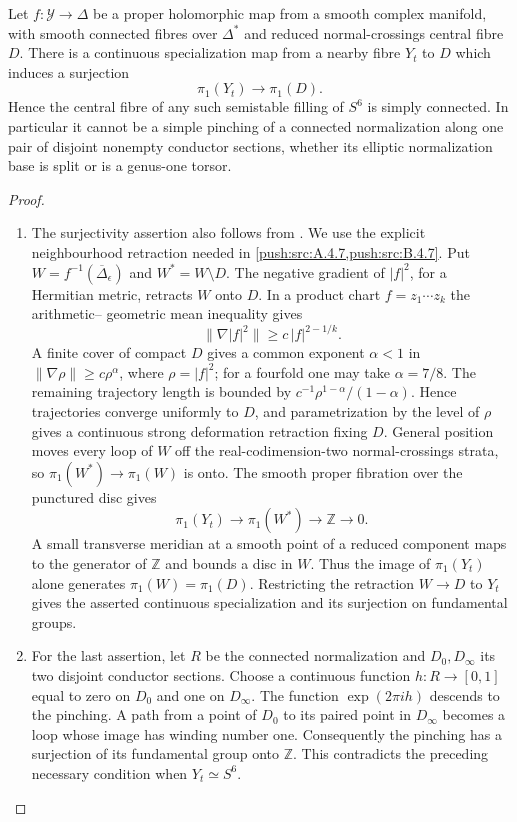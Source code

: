 \begin{theorem}\hypertarget{tag-030O}{}\label{push:src:B.4.2}\label{push:B42}

Let $f:\mathcal Y\to\Delta$ be a
proper holomorphic map from a smooth
complex manifold, with smooth connected
fibres over $\Delta^*$ and reduced
normal-crossings central fibre $D$.
There is a continuous specialization
map from a nearby fibre $Y_t$ to $D$
which induces a surjection
\[
 \pi_1(Y_t)\longrightarrow\pi_1(D).
\]
Hence the central fibre of any such
semistable filling of $S^6$ is simply
connected. In particular it cannot
be a simple pinching of a connected
normalization along one pair of
disjoint nonempty conductor sections,
whether its elliptic normalization
base is split or is a genus-one torsor.
\end{theorem}


\begin{proof}
\begin{enumerate}[label=\arabic*.,leftmargin=*]
\item The surjectivity assertion also follows from
\cite[Theorem~5.1, p.~2226]{NO10}. We use the explicit neighbourhood
retraction needed in \cref{push:src:A.4.7,push:src:B.4.7}. Put
$W=f^{-1}(\overline\Delta_\epsilon)$
and $W^*=W\setminus D$. The negative
gradient of $|f|^2$, for a Hermitian
metric, retracts $W$ onto $D$.
In a product chart
$f=z_1\cdots z_k$ the arithmetic--
geometric mean inequality gives
\[
 \|\nabla |f|^2\|
   \ge c\,|f|^{2-1/k}.
\]
A finite cover of compact $D$ gives
a common exponent $\alpha<1$ in
$\|\nabla\rho\|\ge c\rho^\alpha$,
where $\rho=|f|^2$; for a fourfold
one may take $\alpha=7/8$.
The remaining trajectory length is
bounded by
$c^{-1}\rho^{1-\alpha}/(1-\alpha)$.
Hence trajectories converge uniformly
to $D$, and parametrization by the
level of $\rho$ gives a continuous
strong deformation retraction fixing
$D$. General position moves every
loop of $W$ off the real-codimension-two
normal-crossings strata, so
$\pi_1(W^*)\to\pi_1(W)$ is onto.
The smooth proper fibration over the
punctured disc gives
\[
 \pi_1(Y_t)\longrightarrow\pi_1(W^*)
       \longrightarrow\mathbb Z\longrightarrow0.
\]
A small transverse meridian at a
smooth point of a reduced component
maps to the generator of $\mathbb Z$
and bounds a disc in $W$.
Thus the image of $\pi_1(Y_t)$ alone
generates $\pi_1(W)=\pi_1(D)$. Restricting the retraction
$W\to D$ to $Y_t$ gives the asserted continuous specialization
and its surjection on fundamental groups.

\item For the last assertion, let $R$ be
the connected normalization and
$D_0,D_\infty$ its two disjoint
conductor sections. Choose a
continuous function $h:R\to[0,1]$
equal to zero on $D_0$ and one on
$D_\infty$. The function
$\exp(2\pi i h)$ descends to the
pinching. A path from a point of
$D_0$ to its paired point in
$D_\infty$ becomes a loop whose
image has winding number one.
Consequently the pinching has a
surjection of its fundamental group
onto $\mathbb Z$. This contradicts
the preceding necessary condition
when $Y_t\simeq S^6$.
\end{enumerate}
\end{proof}
